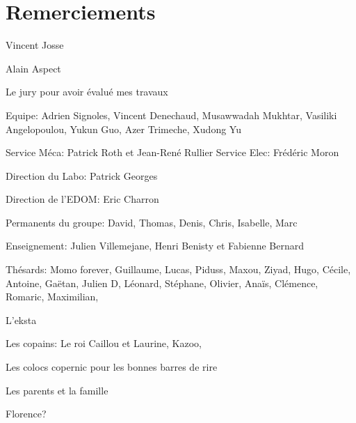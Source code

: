 \chapter*{Remerciements}

Vincent Josse

Alain Aspect

Le jury pour avoir évalué mes travaux

Equipe: Adrien Signoles, Vincent Denechaud, Musawwadah Mukhtar, Vasiliki Angelopoulou, Yukun Guo, Azer Trimeche, Xudong Yu

Service Méca: Patrick Roth et Jean-René Rullier
Service Elec: Frédéric Moron

Direction du Labo: Patrick Georges

Direction de l'EDOM: Eric Charron

Permanents du groupe: David, Thomas, Denis, Chris, Isabelle, Marc

Enseignement: Julien Villemejane, Henri Benisty et Fabienne Bernard

Thésards: Momo forever, Guillaume, Lucas, Piduss, Maxou, Ziyad, Hugo, Cécile, Antoine, Gaëtan, Julien D, Léonard, Stéphane, Olivier, Anaïs, Clémence, Romaric, Maximilian, 

L'eksta

Les copains: Le roi Caillou et Laurine, Kazoo, 

Les colocs copernic pour les bonnes barres de rire

Les parents et la famille

Florence?


